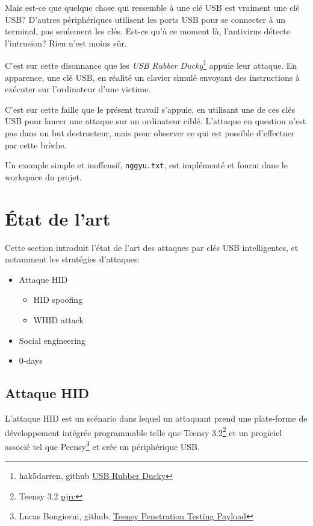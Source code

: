 \documentclass[
  french,
  paper=a4,
  ,captions=tableheading
]{scrartcl}
\providecommand{\tightlist}{%
  \setlength{\itemsep}{0pt}\setlength{\parskip}{0pt}}
\begin{document}
Mais est-ce que quelque chose qui ressemble à une clé USB est vraiment
une clé USB? D'autres périphériques utilisent les ports USB pour se
connecter à un terminal, pas seulement les clés. Est-ce qu'à ce moment
là, l'antivirus détecte l'intrusion? Rien n'est moins sûr.

C'est sur cette disonnance que les \emph{USB Rubber Ducky}\footnote{hak5darren,
  github \href{https://github.com/hak5darren/USB-Rubber-Ducky}{USB
  Rubber Ducky}} appuie leur attaque. En apparence, une clé USB, en
réalité un clavier simulé envoyant des instructions à exécuter sur
l'ordinateur d'une victime.

C'est sur cette faille que le présent travail s'appuie, en utilisant une
de ces clés USB pour lancer une attaque sur un ordinateur ciblé.
L'attaque en question n'est pas dans un but destructeur, mais pour
observer ce qui est possible d'effectuer par cette brèche.

Un exemple simple et inoffensif, \texttt{nggyu.txt}, est implémenté et
fourni dans le workspace du projet.

\hypertarget{uxe9tat-de-lart}{%
\section{État de l'art}\label{uxe9tat-de-lart}}

Cette section introduit l'état de l'art des attaques par clés USB
intelligentes, et notamment les stratégies d'attaques:

\begin{itemize}
\tightlist
\item
  Attaque HID

  \begin{itemize}
  \tightlist
  \item
    HID spoofing
  \item
    WHID attack
  \end{itemize}
\item
  Social engineering
\item
  0-days
\end{itemize}

\hypertarget{attaque-hid}{%
\subsection{Attaque HID}\label{attaque-hid}}

L'attaque HID est un scénario dans lequel un attaquant prend une
plate-forme de développement intégrée programmable telle que Teensy
3.2\footnote{Teensy 3.2
  \href{https://www.pjrc.com/store/teensy32.html}{pjrc}} et un progiciel
associé tel que Peensy\footnote{Lucas Bongiorni, github,
  \href{https://github.com/LucaBongiorni/peensy}{Teensy Penetration
  Testing Payload}} et crée un périphérique USB.
\end{document}
